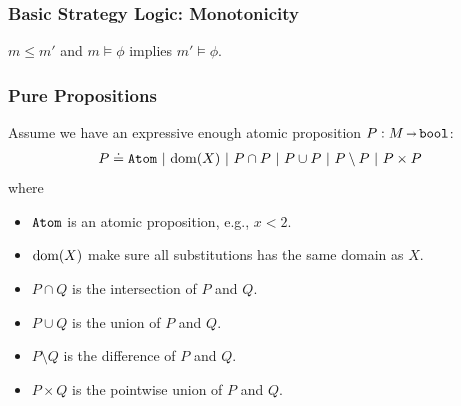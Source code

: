 \begin{frame}[fragile]
    \frametitle{Basic Strategy Logic: Monotonicity}

\begin{lemma}
        $m \leq m'$ and $m \models\phi$ implies $m' \models\phi$.
\end{lemma}

\end{frame}

\begin{frame}[fragile]
    \frametitle{Pure Propositions}

Assume we have an expressive enough atomic proposition $P: M {\,\shortrightarrow\,} {\tt bool}$:
\begin{align*}
P \doteq {\tt Atom} ~|~ \mathrm{dom}(X) ~|~ P \cap P ~|~ P \cup P ~|~ P \setminus P ~|~ P \times P
\end{align*}
where
\begin{itemize}
    \item ${\tt Atom}$ is an atomic proposition, e.g., $x < 2$.
    \item $\mathrm{dom}(X)$ make sure all substitutions has the same domain as $X$.
    \item $P \cap Q$ is the intersection of $P$ and $Q$.
    \item $P \cup Q$ is the union of $P$ and $Q$.
    \item $P \setminus Q$ is the difference of $P$ and $Q$.
    \item $P \times Q$ is the pointwise union of $P$ and $Q$.
\end{itemize}

\end{frame}

